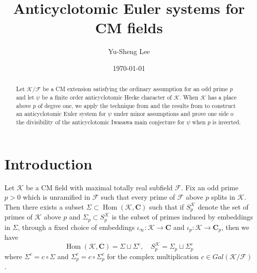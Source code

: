 \documentclass[leqno]{amsart}
\theoremstyle{definition}
\theoremstyle{remark}
\newcommand{\C}{\mathbf C}
\DeclareMathOperator{\Hom}{Hom}
\newcommand{\F}{{\mathcal{F}}} %
\newcommand{\K}{{\mathcal{K}}} %
\begin{document}
\title{Anticyclotomic Euler systems for CM fields}

\begin{abstract}
    Let $\K/\F$ be a CM extension satisfying the ordinary assumption for an odd prime $p$
    and let $\psi$ be a finite order anticyclotomic Hecke character
    of $\K$.
    When $\K$ has a place above $p$ of degree one,
    we apply the technique from \cite{urban}
    and the results from \cite{lee} to construct 
    an anticyclotomic Euler system for $\psi$
    under minor assumptions
    and prove one side o the divisibility of
    the anticyclotomic Iwasawa main conjecture for $\psi$
    when $p$ is inverted.
\end{abstract}


\author[Y-S.~Lee]{Yu-Sheng Lee}
\address{Department of Mathematics, University  of Michigan, Ann Arbor, MI 48109, USA}
\date{\today}

\maketitle
\setcounter{tocdepth}{1}
\tableofcontents

\section*{Introduction}

Let $\K$ be a CM field with maximal totally real subfield $\F$.
Fix an odd prime $p>0$ which is unramified in $\F$
such that every prime of $\F$ above $p$ splits in $\K$.
Then there exists a subset $\Sigma\subset \Hom(\K,\C)$
such that if $S_p^\K$ denote the set of primes of $\K$ above $p$
and $\Sigma_p\subset S_p^\K$ is the subset of primes
induced by embeddings in $\Sigma$,
through a fixed choice of embeddings
$\iota_\infty\colon \K\to \C$ and
$\iota_p\colon \K\to \C_p$, then we have
\[
    \Hom(\K,\C)=\Sigma\sqcup \Sigma^c,\quad
    S_p^\K=\Sigma_p\sqcup \Sigma_p^c
\]
where $\Sigma^c=c\circ \Sigma$ and $\Sigma_p^c=c\circ \Sigma_p^c$
for the complex multiplication $c\in Gal(\K/\F)$.
\end{document}
